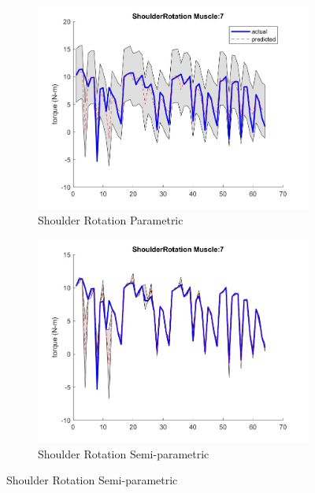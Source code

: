\begin{figure}[htbp]
    \begin{subfigure}[b]{0.45\linewidth}
        \includegraphics[height=0.15\textheight]{Pictures/Results/GPR/ShoulderRotation_7Parametric.jpg}
        \caption{Shoulder Rotation Parametric}
    \end{subfigure}
    \hfill
    \begin{subfigure}[b]{0.45\linewidth}
        \includegraphics[height=0.15\textheight]{Pictures/Results/GPR/ShoulderRotation_7Semiparametric.jpg}
        \caption{Shoulder Rotation Semi-parametric}
    \end{subfigure}
    

\end{figure}
